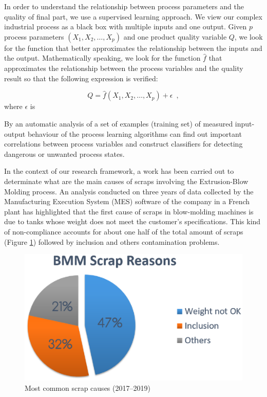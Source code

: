 In order to understand the relationship between process parameters and the quality of final part, we use a supervised learning approach. We view our complex industrial process as a black box with multiple inputs and one output. Given $p$ process parameters $(X_1,X_2,\ldots,X_p)$ and one product quality variable $Q$, we look for the function that better approximates the relationship between the inputs and the output. Mathematically speaking, we look for the function $\hat{f}$ that approximates the relationship between the process variables and the quality result so that the following expression is verified:

\begin{equation}
    Q = \hat{f}(X_1,X_2,\ldots,X_p) + \epsilon
    \enspace,
\end{equation}
where $\epsilon$ is

By an automatic analysis of a set of examples (training set) of measured input-output behaviour of the process learning algorithms can find out important correlations between process variables and construct classifiers for detecting dangerous or unwanted process states.

In the context of our research framework, a work has been carried out to determinate what are the main causes of scraps involving the Extrusion-Blow Molding process. An analysis conducted on three years of data collected by the Manufacturing Execution System (MES) software of the company in a French plant has highlighted that the first cause of scraps in blow-molding machines is due to tanks whose weight does not meet the customer's specifications. This kind of non-compliance accounts for about one half of the total amount of scraps (Figure \ref{fig:Most common scrap causes (2017-2018-2019)}) followed by inclusion and others contamination problems. 

\begin{figure}
\centerline{\includegraphics[scale=0.9]{images/chapter_3/Scraps_codes.eps}}
\caption{Most common scrap causes (2017--2019)}
\label{fig:Most common scrap causes (2017-2018-2019)}
\end{figure}

